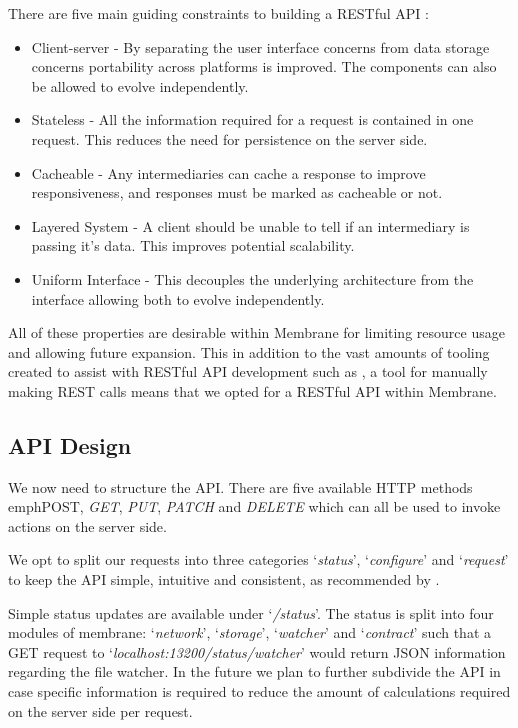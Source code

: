 \documentclass[11pt, a4paper, twoside]{report}
\begin{document}
There are five main guiding constraints to building a RESTful API \citep{fielding2000architectural}: 

\begin{itemize}
 \item Client-server - By separating the user interface concerns from data storage concerns portability across platforms is improved. The components can also be allowed to evolve independently.
 \item Stateless - All the information required for a request is contained in one request. This reduces the need for persistence on the server side.
 \item Cacheable - Any intermediaries can cache a response to improve responsiveness, and responses must be marked as cacheable or not.
 \item Layered System - A client should be unable to tell if an intermediary is passing it's data. This improves potential scalability.
 \item Uniform Interface - This decouples the underlying architecture from the interface allowing both to evolve independently.
\end{itemize}

All of these properties are desirable within Membrane for limiting resource usage and allowing future expansion. This in addition to the vast amounts of tooling created to assist with RESTful API development such as \cite{postman2017api}, a tool for manually making REST calls means that we opted for a RESTful API within Membrane.

\subsection{API Design}

We now need to structure the API. There are five available HTTP methods emph{POST}, \emph{GET}, \emph{PUT}, \emph{PATCH} and \emph{DELETE} which can all be used to invoke actions on the server side.

We opt to split our requests into three categories `\emph{status}', `\emph{configure}' and `\emph{request}' to keep the API simple, intuitive and consistent, as recommended by \cite{google2017api}.

Simple status updates are available under `\emph{/status}'. The status is split into four modules of membrane: `\emph{network}', `\emph{storage}', `\emph{watcher}' and `\emph{contract}' such that a GET request to `\emph{localhost:13200/status/watcher}' would return JSON information regarding the file watcher. In the future we plan to further subdivide the API in case specific information is required to reduce the amount of calculations required on the server side per request.
\end{document}
